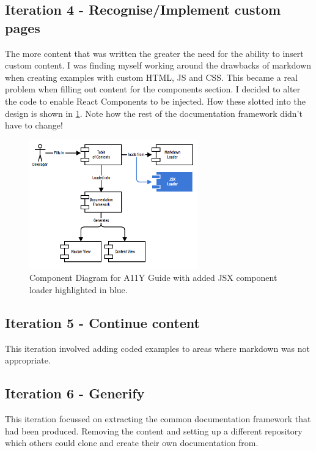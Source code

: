 \subsection{Iteration 4 - Recognise/Implement custom pages}
\label{sec:iteration_4}
The more content that was written the greater the need for the ability to
insert custom content. I was finding myself working around the drawbacks of
markdown when creating examples with custom HTML, JS and CSS. This became a
real problem when filling out content for the components section. I decided
to alter the code to enable React Components to be injected. How these
slotted into the design is
shown in \ref{fig:allycomponent_2}. Note how the rest of the documentation
framework didn't have to change!

\begin{figure}[H]
\centering
\includegraphics[width=0.65\textwidth]{figures/documentation_design_2}
\captionsetup{justification=centering}
\caption[Short figure name.]{Component Diagram for A11Y Guide with added JSX
component loader highlighted in blue.
\label{fig:allycomponent_2}}
\end{figure}

\subsection{Iteration 5 - Continue content}
This iteration involved adding coded examples to areas where markdown was not
appropriate.

\subsection{Iteration 6 - Generify}
This iteration focussed on extracting the common documentation framework that
had been produced. Removing the content and setting up a different repository
which others could clone and create their own documentation from.

